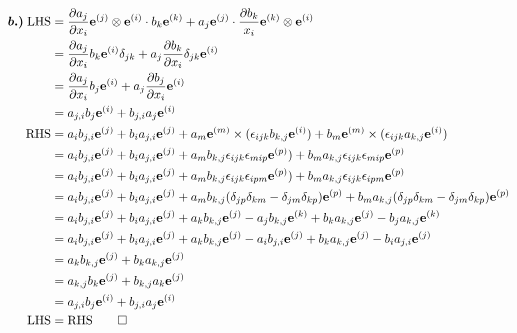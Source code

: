 \begin{align*}
\bm{b.)}\; \text{LHS} &= \frac{\partial a_j}{\partial x_i} \mathbf{e}^{(j)} \otimes \mathbf{e}^{(i)} \cdot b_k \mathbf{e}^{(k)} + a_j \mathbf{e}^{(j)} \cdot \frac{\partial b_k}{x_i}\mathbf{e}^{(k)} \otimes \mathbf{e}^{(i)} \\
&= \frac{\partial a_j}{\partial x_i} b_k \mathbf{e}^{(i)} \delta_{jk} + a_j \frac{\partial b_k}{\partial x_i} \delta_{jk} \mathbf{e}^{(i)} \\
&= \frac{\partial a_j}{\partial x_i} b_j \mathbf{e}^{(i)} + a_j \frac{\partial b_j}{\partial x_i} \mathbf{e}^{(i)} \\
&= a_{j,i} b_j \mathbf{e}^{(i)} + b_{j,i} a_j \mathbf{e}^{(i)} \\
\text{RHS} &= a_i b_{j,i} \mathbf{e}^{(j)}  + b_i a_{j,i} \mathbf{e}^{(j)} + a_m \mathbf{e}^{(m)} \times (\epsilon_{ijk} b_{k,j} \mathbf{e}^{(i)}) + b_m \mathbf{e}^{(m)} \times (\epsilon_{ijk} a_{k,j} \mathbf{e}^{(i)}) \\
&= a_i b_{j,i} \mathbf{e}^{(j)}  + b_i a_{j,i} \mathbf{e}^{(j)} + a_m b_{k,j} \epsilon_{ijk} \epsilon_{mip} \mathbf{e}^{(p)}) + b_m a_{k,j} \epsilon_{ijk} \epsilon_{mip} \mathbf{e}^{(p)} \\
&= a_i b_{j,i} \mathbf{e}^{(j)}  + b_i a_{j,i} \mathbf{e}^{(j)} + a_m b_{k,j} \epsilon_{ijk} \epsilon_{ipm} \mathbf{e}^{(p)}) + b_m a_{k,j} \epsilon_{ijk} \epsilon_{ipm} \mathbf{e}^{(p)} \\
&= a_i b_{j,i} \mathbf{e}^{(j)}  + b_i a_{j,i} \mathbf{e}^{(j)} + a_m b_{k,j} (\delta_{jp}\delta_{km} - \delta_{jm}\delta_{kp}) \mathbf{e}^{(p)} + b_m a_{k,j} (\delta_{jp}\delta_{km} - \delta_{jm}\delta_{kp}) \mathbf{e}^{(p)} \\
&= a_i b_{j,i} \mathbf{e}^{(j)}  + b_i a_{j,i} \mathbf{e}^{(j)} + a_k b_{k,j} \mathbf{e}^{(j)} - a_j b_{k,j} \mathbf{e}^{(k)} + b_k a_{k,j} \mathbf{e}^{(j)} - b_j a_{k,j} \mathbf{e}^{(k)} \\
&= a_i b_{j,i} \mathbf{e}^{(j)}  + b_i a_{j,i} \mathbf{e}^{(j)} + a_k b_{k,j} \mathbf{e}^{(j)} - a_i b_{j,i} \mathbf{e}^{(j)} + b_k a_{k,j} \mathbf{e}^{(j)} - b_i a_{j,i} \mathbf{e}^{(j)} \\
&= a_k b_{k,j} \mathbf{e}^{(j)} + b_k a_{k,j} \mathbf{e}^{(j)} \\
&= a_{k,j} b_k \mathbf{e}^{(j)} + b_{k,j} a_k \mathbf{e}^{(j)} \\
&= a_{j,i} b_j \mathbf{e}^{(i)} + b_{j,i} a_j \mathbf{e}^{(i)} \\
\text{LHS} &= \text{RHS} \qed \\
\end{align*}

